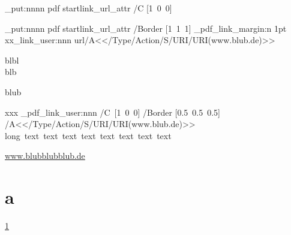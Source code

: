 \documentclass{article}
\begin{document}
\ExplSyntaxOn
\hook_put:nnnn
     { pdf }
     { startlink_url_attr }
     { /C }
     { [1~0~0] }

\hook_put:nnnn
       { pdf }
       { startlink_url_attr }
       { /Border }
       { [1~1~1] }
\driver_pdf_link_margin:n {1pt}
xx\pdf_link_user:nnn {url}{/A<</Type/Action/S/URI/URI(www.blub.de)>>}{blbl\\blb\par blub}

\par\bigskip
xxx
\driver_pdf_link_user:nnn
 {/C~[1~0~0]
 /Border [0.5~0.5~0.5]}
 {/A<</Type/Action/S/URI/URI(www.blub.de)>>}
 {long~text~text~text~text~text~text~text~text}

\url{www.blubblubblub.de}
\section{a}\label{a}
\ref{a}
\ExplSyntaxOff
{}
\end{document}
